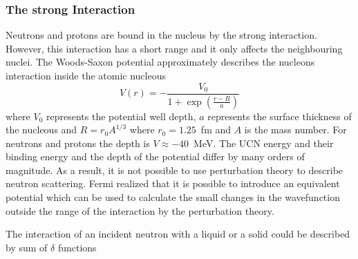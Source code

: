 

\subsubsection{The strong Interaction}
Neutrons and protons are bound in the nucleus by the strong
interaction. However, this interaction has a short range and it only
affects the neighbouring nuclei.
The Woods-Saxon potential approximately
describes the nucleons interaction inside the atomic nucleous
\begin{equation}
  \label{eqn:woodsax}
  V(r) = - \frac{V_0}{1+\exp(\frac{r-R}{a})}
\end{equation}
where $V_0$ represents the potential well depth, $a$ represents the
surface thickness of the nucleous and $R = r_0 A^{1/3}$ where
$r_0 = 1.25$~fm and $A$ is the mass number. For neutrons and protons
the depth is $V \approx -40$~MeV. The UCN energy and their binding
energy and the depth of the potential differ by many orders of
magnitude. As a result, it is not possible to use perturbation theory
to describe neutron scattering. Fermi realized that it is possible to
introduce an equivalent potential which can be used to calculate the
small changes in the wavefunction outside the range of the interaction
by the perturbation theory.

The interaction of an incident neutron with a liquid or a solid could
be described by sum of $\delta$ functions

